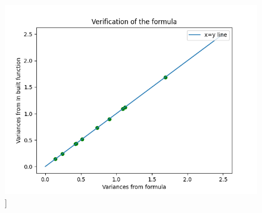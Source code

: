 \documentclass[journal,12pt,twocolumn]{IEEEtran}
\begin{document}
\begin{figure}[h]
\includegraphics[scale = 0.7]{ogimage}]
\end{figure}
\end{document}
